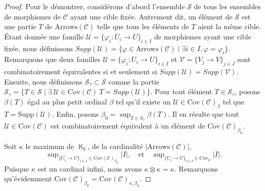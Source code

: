 \begin{proof}
Pour le démontrer, considérons d'abord l'ensemble $\mathcal{S}$ de tous les
ensembles de morphismes de $\mathcal{C}$ ayant une cible fixée.
Autrement dit, un élément de $\mathcal{S}$ est une partie $T$ de
$\text{Arrows}(\mathcal{C})$ telle que tous les éléments de $T$ aient la même
cible. Étant donnée une famille
$\mathcal{U} = \{\varphi_i : U_i \to U\}_{i\in I}$ de morphismes ayant une
cible fixée, nous définissons
$Supp(\mathcal{U}) = \{ \varphi \in \text{Arrows}(\mathcal{C})
\mid \exists i\in I, \varphi = \varphi_i\}$.
Remarquons que deux familles
$\mathcal{U} =  \{\varphi_i : U_i \to U\}_{i\in I}$ et
$\mathcal{V} = \{V_j \to V\}_{j \in J}$ sont combinatoirement équivalentes
si et seulement si $Supp(\mathcal{U}) = Supp(\mathcal{V})$.
Ensuite, nous définissons $\mathcal{S}_\tau \subset \mathcal{S}$ comme la
partie
$\mathcal{S}_\tau = \{ T \in \mathcal{S} \mid
\exists\ \mathcal{U} \in \text{Cov}(\mathcal{C}) \ T = Supp(\mathcal{U})\}$.
Pour tout élément $T \in \mathcal{S}_\tau$, posons $\beta(T)$ égal au plus
petit ordinal $\beta$ tel qu'il existe un
$\mathcal{U} \in \text{Cov}(\mathcal{C})_\beta$ tel que
$T = \text{Supp}(\mathcal{U})$. Enfin, posons
$\beta_0 = \sup_{T \in S_\tau} \beta(T)$.
Il en résulte que tout $\mathcal{U} \in \text{Cov}(\mathcal{C})$ est
combinatoirement équivalent à un élément de
$\text{Cov}(\mathcal{C})_{\beta_0}$.

\medskip\noindent
Soit $\kappa$ le maximum de $\aleph_0$, de la cardinalité
$|\text{Arrows}(\mathcal{C})|$,
$$
\sup\nolimits_{\{U_i \to U\}_{i\in I} \in \text{Cov}(\mathcal{C})_{\beta_0}}
|I|,
\quad\text{et}\quad
\sup\nolimits_{\{U_i \to U\}_{i\in I} \in \text{Cov}_0} |I|.
$$
Puisque $\kappa$ est un cardinal infini, nous avons
$\kappa \otimes \kappa = \kappa$. Remarquons qu'évidemment
$\text{Cov}(\mathcal{C})_{\beta_0} =
\text{Cov}(\mathcal{C})_{\kappa, \beta_0}$.


\end{proof}
